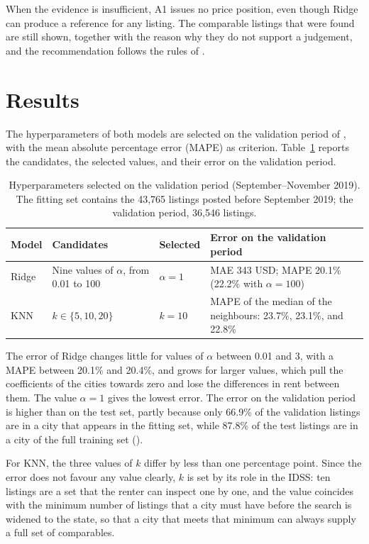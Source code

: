 \documentclass[12pt,a4paper]{report}
\begin{document}
When the evidence is insufficient, A1 issues no price position, even though
Ridge can produce a reference for any listing. The comparable listings that
were found are still shown, together with the reason why they do not
support a judgement, and the recommendation follows the rules of
.

\section{Results}
\label{sec:datadriven-results}

The hyperparameters of both models are selected on the validation period of
, with the mean absolute percentage error
(MAPE) as criterion. Table~\ref{tab:modelresults} reports the candidates, the
selected values, and their error on the validation period.

\begin{table}[H]
\centering
\caption{Hyperparameters selected on the validation period
(September--November 2019). The fitting set contains the 43,765 listings
posted before September 2019; the validation period, 36,546 listings.}
\label{tab:modelresults}
\begin{tabularx}{\textwidth}{p{1.4cm} p{3.9cm} p{1.7cm} X}
\toprule
\textbf{Model} & \textbf{Candidates} & \textbf{Selected} &
\textbf{Error on the validation period}\\
\midrule
Ridge & Nine values of $\alpha$, from 0.01 to 100 & $\alpha = 1$ &
MAE 343 USD; MAPE 20.1\% (22.2\% with $\alpha = 100$)\\
\addlinespace
KNN & $k \in \{5, 10, 20\}$ & $k = 10$ &
MAPE of the median of the neighbours: 23.7\%, 23.1\%, and 22.8\%\\
\bottomrule
\end{tabularx}
\end{table}

The error of Ridge changes little for values of $\alpha$ between 0.01 and 3,
with a MAPE between 20.1\% and 20.4\%, and grows for larger values, which
pull the coefficients of the cities towards zero and lose the differences in
rent between them. The value $\alpha = 1$ gives the lowest error. The error
on the validation period is higher than on the test set, partly
because only 66.9\% of the validation listings are in a city that appears in
the fitting set, while 87.8\% of the test listings are in a city of the full
training set ().

For KNN, the three values of $k$ differ by less than one percentage point.
Since the error does not favour any value clearly, $k$ is set by its role in
the IDSS: ten listings are a set that the renter can inspect one by one, and
the value coincides with the minimum number of listings that a city must have
before the search is widened to the state, so that a city that meets that
minimum can always supply a full set of comparables.
\end{document}
